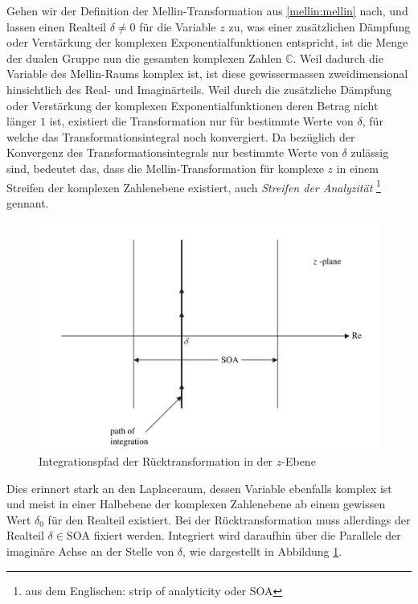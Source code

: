 Gehen wir der Definition der Mellin-Transformation aus 
\eqref{mellin:mellin} nach, und lassen einen Realteil $\delta \neq 0$ für 
die Variable $z$ zu, was einer zusätzlichen Dämpfung oder Verstärkung der 
komplexen Exponentialfunktionen entspricht, ist die Menge der dualen 
Gruppe nun die gesamten komplexen Zahlen $\mathbb{C}$.
Weil dadurch die Variable des Mellin-Raums komplex ist, ist diese 
gewissermassen zweidimensional hinsichtlich des Real- und Imaginärteils. 
Weil durch die zusätzliche Dämpfung oder Verstärkung der komplexen 
Exponentialfunktionen deren Betrag nicht länger $1$ ist, existiert die 
Transformation nur für bestimmte Werte von $\delta$, für welche das 
Transformationsintegral noch konvergiert.
Da bezüglich der Konvergenz des Transformationsintegrals nur bestimmte 
Werte von $\delta$ zulässig sind, bedeutet das, dass die 
Mellin-Transformation für komplexe $z$ in einem Streifen der komplexen 
Zahlenebene existiert, auch \emph{Streifen der Analyzität} 
\footnote{aus dem Englischen: strip of analyticity oder SOA} gennant.
\begin{figure}
    \centering
    \includegraphics[width=.5\textwidth]{papers/mellin/images/mellin_z}
    \caption{Integrationspfad der Rücktransformation in der $z$-Ebene}
    \label{fig:mellin:z}
\end{figure}
Dies erinnert stark an den Laplaceraum, dessen Variable ebenfalls komplex 
ist und meist in einer Halbebene der komplexen Zahlenebene ab einem 
gewissen Wert $\delta_0$ für den Realteil existiert.
Bei der Rücktransformation muss allerdings der Realteil 
$\delta \in \text{SOA}$ fixiert werden. 
Integriert wird daraufhin über die Parallele der imaginäre Achse an der 
Stelle von $\delta$, wie dargestellt in Abbildung \ref{fig:mellin:z}.

